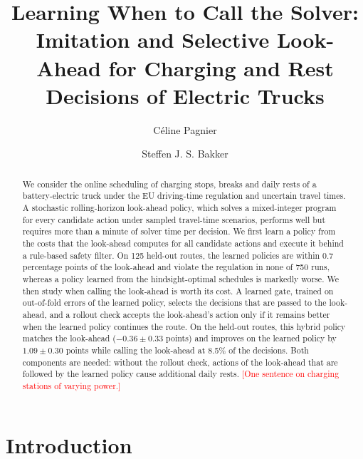 \documentclass[runningheads]{llncs}
\newcommand{\tbd}[1]{\textcolor{red}{[#1]}}
\begin{document}
%
\title{Learning When to Call the Solver: Imitation and Selective Look-Ahead
for Charging and Rest Decisions of Electric Trucks}
%
\author{C\'eline Pagnier \and
Steffen J. S. Bakker}
%
%
\maketitle
%
\begin{abstract}
We consider the online scheduling of charging stops, breaks and daily rests
of a battery-electric truck under the EU driving-time regulation and uncertain
travel times. A stochastic rolling-horizon look-ahead policy, which solves a
mixed-integer program for every candidate action under sampled travel-time
scenarios, performs well but requires more than a minute of solver time per
decision. We first learn a policy from the costs that the look-ahead computes
for all candidate actions and execute it behind a rule-based safety filter. On
125 held-out routes, the learned policies are within 0.7 percentage points of
the look-ahead and violate the regulation in none of 750 runs, whereas a policy
learned from
the hindsight-optimal schedules is markedly worse. We then study when calling
the look-ahead is worth its cost. A learned gate, trained on out-of-fold
errors of the learned policy, selects the decisions that are passed to the
look-ahead, and a rollout check accepts the look-ahead's action only if it
remains better when the learned policy continues the route. On the held-out
routes, this hybrid policy matches the look-ahead ($-0.36\pm0.33$ points) and
improves on the learned policy by $1.09\pm0.30$ points while calling the
look-ahead at 8.5\% of the decisions. Both components are needed: without the
rollout check, actions of the look-ahead that are followed by the learned
policy cause additional daily rests. \tbd{One sentence on charging stations of
varying power.}
\end{abstract}
%
%
\section{Introduction}
\label{sec:intro}
\end{document}
